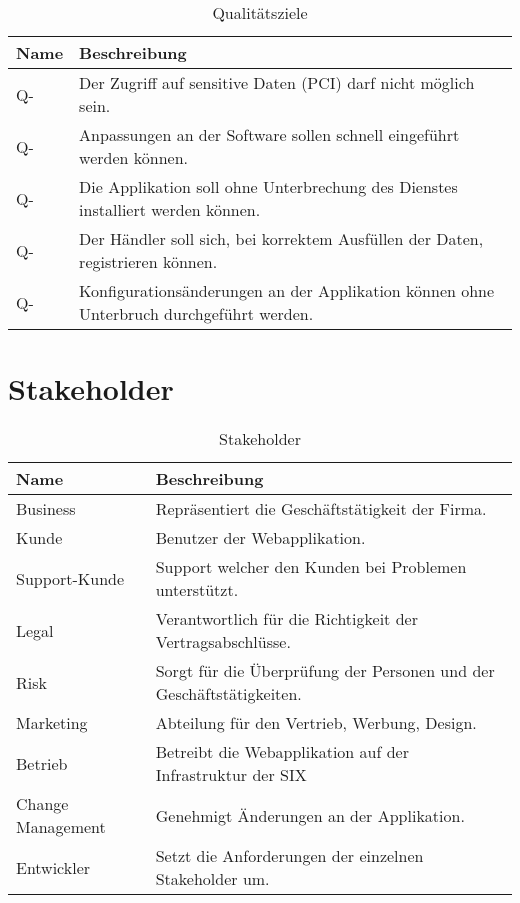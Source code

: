 \begin{table}[H]
	\centering
	\caption{Qualitätsziele}
	\begin{tabular}{ | p{3cm} | p{12cm} | }
		\toprule
		{\textbf{Name}} & {\textbf{Beschreibung}} \\
		\midrule
		Q-\arabic{quatar} \stepcounter{quatar} & Der Zugriff auf sensitive Daten (PCI) darf nicht möglich sein.\\ \hline
		Q-\arabic{quatar} \stepcounter{quatar} & Anpassungen an der Software sollen schnell eingeführt werden können. \\ \hline
		Q-\arabic{quatar} \stepcounter{quatar} & Die Applikation soll ohne Unterbrechung des Dienstes installiert werden können. \\ \hline
		Q-\arabic{quatar} \stepcounter{quatar} & Der Händler soll sich, bei korrektem Ausfüllen der Daten, registrieren können.\\ \hline
		Q-\arabic{quatar} \stepcounter{quatar} & Konfigurationsänderungen an der Applikation können ohne Unterbruch durchgeführt werden. \\
		\bottomrule
	\end{tabular}
\end{table}

\section{Stakeholder}

\begin{table}[H]
	\centering
	\caption{Stakeholder}
	\begin{tabular}{ | p{3cm} | p{12cm} | }
		\toprule
		{\textbf{Name}} & {\textbf{Beschreibung}} \\
		\midrule
		Business & Repräsentiert die Geschäftstätigkeit der Firma.\\ \hline
		Kunde & Benutzer der Webapplikation. \\ \hline
		Support-Kunde & Support welcher den Kunden bei Problemen unterstützt. \\ \hline
		Legal &  Verantwortlich für die Richtigkeit der Vertragsabschlüsse. \\ \hline
		Risk & Sorgt für die Überprüfung der Personen und der Geschäftstätigkeiten. \\ \hline
		Marketing & Abteilung für den Vertrieb, Werbung, Design. \\ \hline
		Betrieb & Betreibt die Webapplikation auf der Infrastruktur der SIX \\ \hline
		Change Management & Genehmigt Änderungen an der Applikation. \\ \hline
		Entwickler & Setzt die Anforderungen der einzelnen Stakeholder um. \\
		\bottomrule
	\end{tabular}
\end{table}
